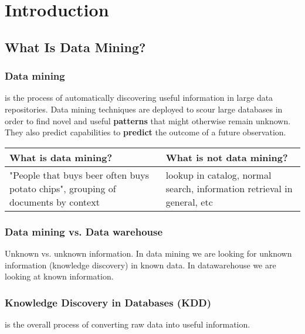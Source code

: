 \chapter{Introduction}
\clearpage

\section{What Is Data Mining?}
	
	\subsection*{Data mining} is the process of automatically discovering useful information
	in large data repositories. Data mining techniques are deployed to scour large 
	databases in order to find novel and useful {\bf patterns} that might otherwise remain 
	unknown. They also predict capabilities to {\bf predict} the outcome of a future 
	observation.

	\begin{table}[H]
	\begin{tabular}{| p{6cm} | p{6cm} |}
		\hline
		{\bf What is data mining?} & {\bf What is not data mining?} \\ \hline
		"People that buys beer often buys potato chips", 
		grouping of documents by context & 
		lookup in catalog, normal search, information retrieval in general, etc \\ \hline
	\end{tabular}
	\end{table}	

	\subsection*{Data mining vs. Data warehouse} Unknown vs. unknown information. 
	In data mining we are looking for unknown information (knowledge discovery) in known data. 
	In datawarehouse we are looking at known information. 

	\subsection*{Knowledge Discovery in Databases (KDD)} is the overall process of converting raw 
	data into useful information. 

